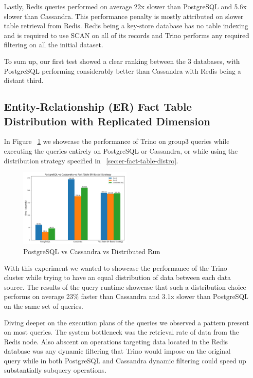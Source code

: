 \documentclass[conference]{IEEEtran}
\begin{document}
Lastly, Redis queries performed on average 22x slower than PostgreSQL and 5.6x slower than Cassandra. This performance penalty is mostly attributed on slower table retrieval from Redis. Redis being a key-store database has no table indexing and is required to use SCAN on all of its records and Trino performs any required filtering on all the initial dataset.

To sum up, our first test showed a clear ranking between the 3 databases, with PostgreSQL performing considerably better than Cassandra with Redis being a distant third.

\subsection{Entity-Relationship (ER) Fact Table Distribution with
	Replicated Dimension}
\label{sec:distribution-based-on-fact-tables-er}

In Figure ~\ref{fig:psql-cass-distro} we showcase the performance of Trino on group3 queries while executing the queries entirely on PostgreSQL or Cassandra, or while using the distribution strategy specified in ~\ref{sec:er-fact-table-distro}.

\begin{figure}[h]
	\centering
	\includegraphics[width=0.5\textwidth]{images/No_distro_vs_dist1/no_dist_vs_dist1.png}
	\caption{PostgreSQL vs Cassandra vs Distributed Run}
	\label{fig:psql-cass-distro}
\end{figure}

With this experiment we wanted to showcase the performance of the Trino cluster while trying to have an equal distribution of data between each data source. The results of the query runtime showcase that such a distribution choice performs on average 23\% faster than Cassandra and 3.1x slower than PostgreSQL on the same set of queries.

Diving deeper on the execution plans of the queries we observed a pattern present on most queries. The system bottleneck was the retrieval rate of data from the Redis node. Also abscent on operations targeting data located in the Redis database was any dynamic filtering that Trino would impose on the original query while in both PostgreSQL and Cassandra dynamic filtering could speed up substantially subquery operations.
\end{document}

